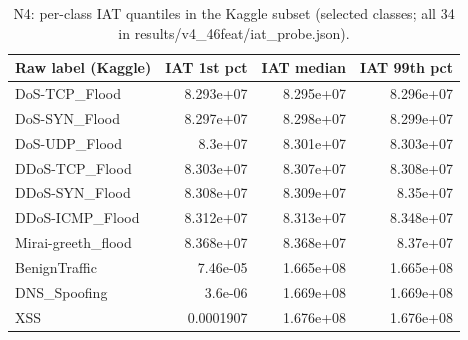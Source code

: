 \begin{table}[!t]
\centering
\caption{N4: per-class IAT quantiles in the Kaggle subset (selected classes; all 34 in results/v4\_46feat/iat\_probe.json).}\label{tab:iat}
\scriptsize
\setlength{\tabcolsep}{3pt}
\begin{tabular}{lrrr}
\toprule
\textbf{Raw label (Kaggle)} & \textbf{IAT 1st pct} & \textbf{IAT median} & \textbf{IAT 99th pct} \\
\midrule
DoS-TCP\_Flood & 8.293e+07 & 8.295e+07 & 8.296e+07 \\
DoS-SYN\_Flood & 8.297e+07 & 8.298e+07 & 8.299e+07 \\
DoS-UDP\_Flood & 8.3e+07 & 8.301e+07 & 8.303e+07 \\
DDoS-TCP\_Flood & 8.303e+07 & 8.307e+07 & 8.308e+07 \\
DDoS-SYN\_Flood & 8.308e+07 & 8.309e+07 & 8.35e+07 \\
DDoS-ICMP\_Flood & 8.312e+07 & 8.313e+07 & 8.348e+07 \\
Mirai-greeth\_flood & 8.368e+07 & 8.368e+07 & 8.37e+07 \\
BenignTraffic & 7.46e-05 & 1.665e+08 & 1.665e+08 \\
DNS\_Spoofing & 3.6e-06 & 1.669e+08 & 1.669e+08 \\
XSS & 0.0001907 & 1.676e+08 & 1.676e+08 \\
\bottomrule
\end{tabular}
\end{table}
